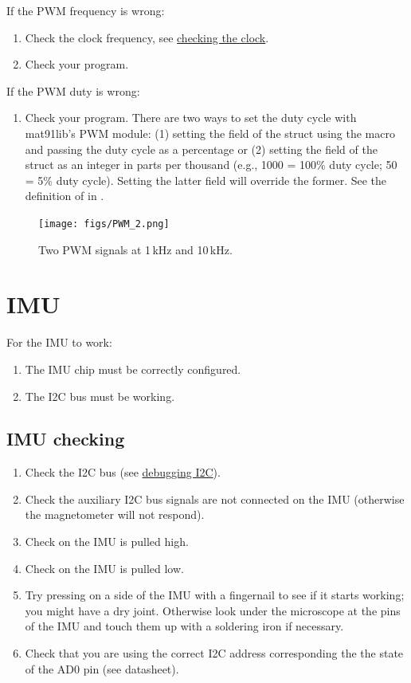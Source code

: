 If the PWM frequency is wrong:

\begin{enumerate}
\item
  Check the clock frequency, see
  \hyperref[checking-the-clock]{checking the clock}.
\item
  Check your program.
\end{enumerate}

If the PWM duty is wrong:

\begin{enumerate}
\item
  Check your program. There are two ways to set the duty cycle with
  mat91lib's PWM module: (1) setting the  field of the
   struct using the  macro and
  passing the duty cycle as a percentage or (2) setting the
   field of the  struct as an integer
  in parts per thousand (e.g., 1000 = 100\% duty cycle; 50 = 5\% duty
  cycle). Setting the latter field will override the former. See the
  definition of  in .
\end{enumerate}

\begin{figure}[!h]
\centering
\texttt{[image: figs/PWM\_2.png]}
\caption{Two PWM signals at 1\,kHz and 10\,kHz.}
\end{figure}


\section{IMU}
\label{imu}

For the IMU to work:
%
\begin{enumerate}
\item The IMU chip must be correctly configured.
\item The I2C bus must be working.
\end{enumerate}


\subsection{IMU checking}
\label{checking-IMU}

\begin{enumerate}
\item Check the I2C bus (see \hyperref[debugging-i2c]{debugging I2C}).
\item Check the auxiliary I2C bus signals are not connected on the IMU
  (otherwise the magnetometer will not respond).
\item Check  on the IMU is pulled high.
\item Check  on the IMU is pulled low.
\item Try pressing on a side of the IMU with a fingernail to see if it
  starts working; you might have a dry joint.  Otherwise look under
  the microscope at the pins of the IMU and touch them up with a
  soldering iron if necessary.
\item Check that you are using the correct I2C address corresponding
the the state of the AD0 pin (see datasheet).
\end{enumerate}


